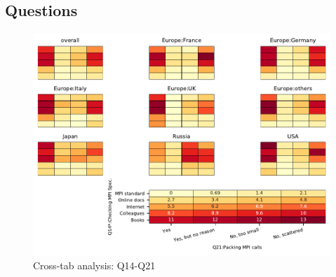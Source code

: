 
\subsection{Questions}


\begin{figure}
\begin{center}
\includegraphics[width=12cm]{../pdfs/Q14-Q21.pdf}
\caption{Cross-tab analysis: Q14-Q21}
\label{fig:Q14-Q21}
\end{center}
\end{figure}
